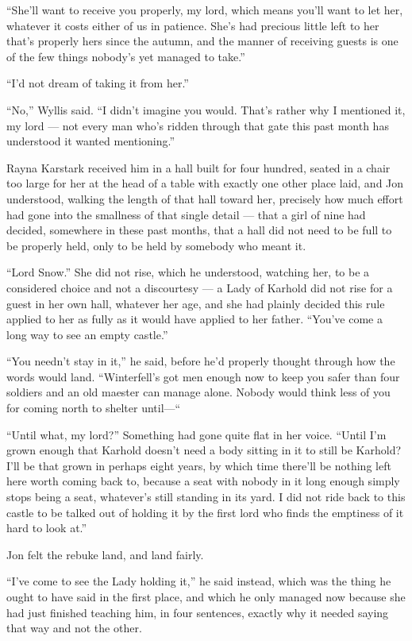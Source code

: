 “She’ll want to receive you properly, my lord, which means you’ll want to let her, whatever it costs either of us in patience. She’s had precious little left to her that’s properly hers since the autumn, and the manner of receiving guests is one of the few things nobody’s yet managed to take.”

“I’d not dream of taking it from her.”

“No,” Wyllis said. “I didn’t imagine you would. That’s rather why I mentioned it, my lord — not every man who’s ridden through that gate this past month has understood it wanted mentioning.”

\sceneBreak

Rayna Karstark received him in a hall built for four hundred, seated in a chair too large for her at the head of a table with exactly one other place laid, and Jon understood, walking the length of that hall toward her, precisely how much effort had gone into the smallness of that single detail — that a girl of nine had decided, somewhere in these past months, that a hall did not need to be full to be properly held, only to be held by somebody who meant it.

“Lord Snow.” She did not rise, which he understood, watching her, to be a considered choice and not a discourtesy — a Lady of Karhold did not rise for a guest in her own hall, whatever her age, and she had plainly decided this rule applied to her as fully as it would have applied to her father. “You’ve come a long way to see an empty castle.”

“You needn’t stay in it,” he said, before he’d properly thought through how the words would land. “Winterfell’s got men enough now to keep you safer than four soldiers and an old maester can manage alone. Nobody would think less of you for coming north to shelter until—“

“Until what, my lord?” Something had gone quite flat in her voice. “Until I’m grown enough that Karhold doesn’t need a body sitting in it to still be Karhold? I’ll be that grown in perhaps eight years, by which time there’ll be nothing left here worth coming back to, because a seat with nobody in it long enough simply stops being a seat, whatever’s still standing in its yard. I did not ride back to this castle to be talked out of holding it by the first lord who finds the emptiness of it hard to look at.”

Jon felt the rebuke land, and land fairly.

“I’ve come to see the Lady holding it,” he said instead, which was the thing he ought to have said in the first place, and which he only managed now because she had just finished teaching him, in four sentences, exactly why it needed saying that way and not the other.

